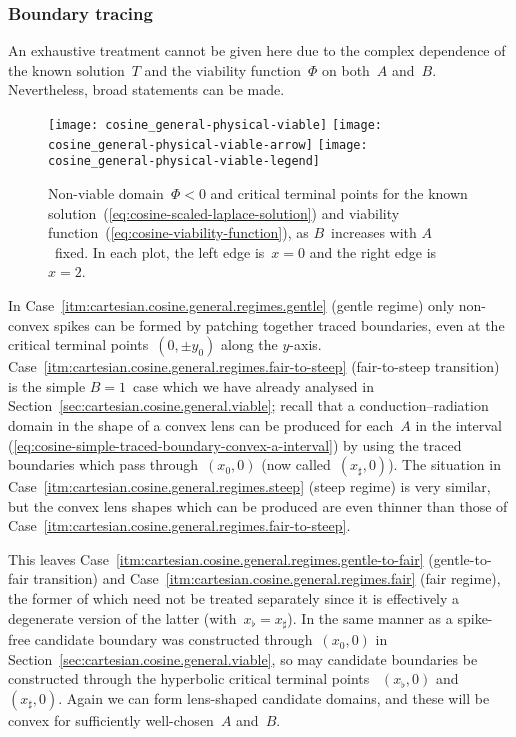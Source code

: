 \subsubsection{Boundary tracing}
\label{sec:cartesian.cosine.general.tracing}

An exhaustive treatment cannot be given here
due to the complex dependence
of the known solution~$T$ and the viability function~$\Phi$
on both~$A$ and~$B$.
Nevertheless, broad statements can be made.

\begin{figure}
  \centering
  \texttt{[image: cosine\_general-physical-viable]}
  \texttt{[image: cosine\_general-physical-viable-arrow]}
  \texttt{[image: cosine\_general-physical-viable-legend]}
  \caption{
    Non-viable domain~$\Phi < 0$ and critical terminal points
    for the known solution~(\ref{eq:cosine-scaled-laplace-solution})
    and viability function~(\ref{eq:cosine-viability-function}),
    as $B$~increases with $A$~fixed.
    In each plot, the left edge is~$x = 0$ and the right edge is~$x = 2$.
  }
  \label{fig:cosine_general-physical-viable}
\end{figure}

In Case~\ref{itm:cartesian.cosine.general.regimes.gentle} (gentle regime)
only non-convex spikes can be formed
by patching together traced boundaries,
even at the critical terminal points~$(0, \pm y_0)$ along the $y$-axis.
Case~\ref{itm:cartesian.cosine.general.regimes.fair-to-steep}
  (fair-to-steep transition)
is the simple $B = 1$~case which we have already analysed
in Section~\ref{sec:cartesian.cosine.general.viable};
recall that a conduction--radiation domain in the shape of a convex lens
can be produced for each~$A$ in the interval~%
  (\ref{eq:cosine-simple-traced-boundary-convex-a-interval})
by using the traced boundaries which pass through~$(x_0, 0)$
(now called~$(x_\sharp, 0)$).
The situation in
Case~\ref{itm:cartesian.cosine.general.regimes.steep} (steep regime)
is very similar,
but the convex lens shapes which can be produced
are even thinner than those of
Case~\ref{itm:cartesian.cosine.general.regimes.fair-to-steep}.

This leaves
Case~\ref{itm:cartesian.cosine.general.regimes.gentle-to-fair}
  (gentle-to-fair transition)
and
Case~\ref{itm:cartesian.cosine.general.regimes.fair} (fair regime),
the former of which need not be treated separately
since it is effectively a degenerate version of the latter
(with~$x_\flat = x_\sharp$).
In the same manner as a spike-free candidate boundary
was constructed through~$(x_0, 0)$
in Section~\ref{sec:cartesian.cosine.general.viable},
so may candidate boundaries be constructed
through the hyperbolic critical terminal points~%
  $(x_\flat, 0)$ and~$(x_\sharp, 0)$.
Again we can form lens-shaped candidate domains,
and these will be convex for sufficiently well-chosen~$A$ and~$B$.

